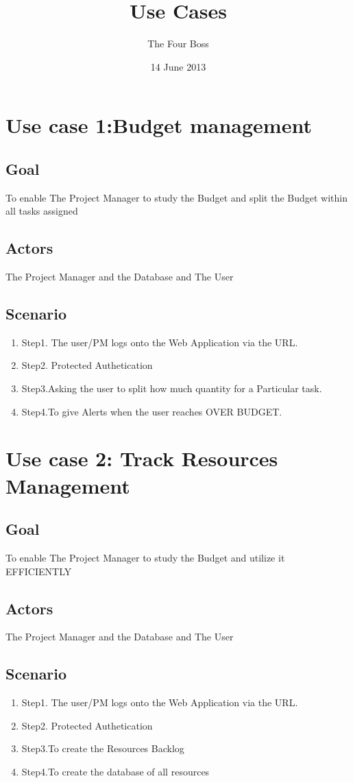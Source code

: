 \documentclass[10pt]{article}
\title{Use Cases}
\author{The Four Boss}
\date{ 14 June 2013}
\begin{document}
\maketitle
\tableofcontents
\section*{Use case 1:Budget management}
\subsection{Goal}
To enable The Project Manager to study the Budget and split the Budget within all tasks assigned
\subsection{Actors}
The Project Manager and the Database and The User 
\subsection{Scenario}
\begin{enumerate}
\item Step1. The user/PM logs onto the Web Application via the URL.
\item Step2. Protected Authetication
\item Step3.Asking the user to split how much quantity for a Particular task.
\item Step4.To give Alerts when the user reaches OVER BUDGET.
\end{enumerate}


\section*{Use case 2: Track Resources Management}
\subsection{Goal}
To enable The Project Manager to study the Budget and utilize it EFFICIENTLY
\subsection{Actors}
The Project Manager and the Database and The User 
\subsection{Scenario}
\begin{enumerate}
\item Step1. The user/PM logs onto the Web Application via the URL.
\item Step2. Protected Authetication
\item Step3.To create the Resources Backlog
\item Step4.To create the database of all resources 
\end{enumerate}
\end{document}
